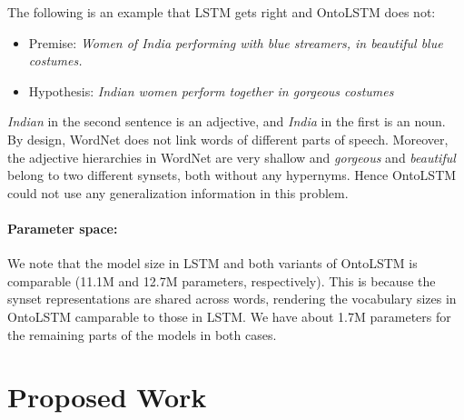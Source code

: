 The following is an example that LSTM gets right and OntoLSTM does not:
\begin{itemize}
 \item Premise: \textit{Women of India performing with blue streamers, in beautiful blue costumes.}
 \item Hypothesis: \textit{Indian women perform together in gorgeous costumes}
\end{itemize}
\textit{Indian} in the second sentence is an adjective, and \textit{India} in the first is an noun. By design, WordNet does not link words of different parts of speech. Moreover, the adjective hierarchies in WordNet are very shallow and \textit{gorgeous} and \textit{beautiful} belong to two different synsets, both without any hypernyms. Hence OntoLSTM could not use any generalization information in this problem.

\paragraph{Parameter space:} We note that the model size in LSTM and both variants of OntoLSTM is comparable (11.1M and 12.7M parameters, respectively). This is because the synset representations are shared across words, rendering the vocabulary sizes in OntoLSTM camparable to those in LSTM. We have about 1.7M parameters for the remaining parts of the models in both cases. 

\section{Proposed Work}

